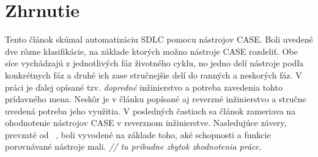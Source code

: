 \documentclass[10pt,twoside,slovak,a4paper]{article}
\begin{document}
 
\section{Zhrnutie} \label{zhrnutie} 
Tento článok skúmal automatizáciu SDLC pomocu nástrojov CASE. Boli uvedené dve rôzne klasifikácie, na základe ktorých možno nástroje CASE rozdeliť. Obe síce vychádzajú z jednotlivých fáz životného cyklu, no jedno delí nástroje podľa konkrétnych fáz a druhé ich zase stručnejšie delí do ranných a neskorých fáz.
V práci je ďalej opísané tzv. \emph{dopredné} inžinierstvo a potreba zavedenia tohto prídavného mena. Neskôr je v článku popísané aj reverzné inžinierstvo a stručne uvedená potreba jeho využitia. 
V posledných častiach sa článok zameriava na ohodnotenie nástrojov CASE v reverznom inžinierstve. Nasledujúce závery, prevzaté od~ \cite{Osman:RE}, boli vyvodené na základe toho, aké schopnosti a funkcie porovnávané nástroje mali.
\emph{// tu pribudne zbytok zhodnotenia práce.}






\end{document}
